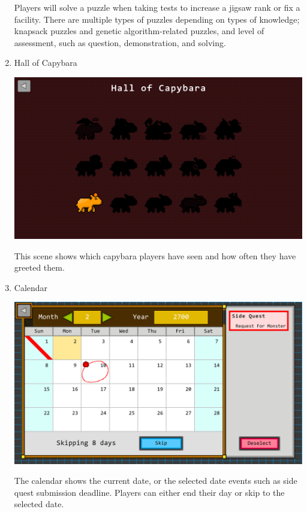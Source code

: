 \documentclass[12pt,oneside,openright,a4paper]{cpe-english-project}
\begin{document}
\begin{enumerate}
\begin{minipage}[c]{\textwidth}
	\end{minipage}
	Players will solve a puzzle when taking tests to increase a jigsaw rank or fix a facility. There are multiple types of puzzles depending on types of knowledge; knapsack puzzles and genetic algorithm-related puzzles, and level of assessment, such as question, demonstration, and solving.

	\item Hall of Capybara \\
	\begin{minipage}[c]{\textwidth}\centering
	\includegraphics[width=14cm]{figure/screenshot/screenshot-HoC.png}
	\end{minipage}
	This scene shows which capybara players have seen and how often they have greeted them.

	\item Calendar \\
	\begin{minipage}[c]{\textwidth}\centering
	\includegraphics[width=14cm]{figure/screenshot/screenshot-calendar.png}
	\end{minipage}
	The calendar shows the current date, or the selected date events such as side quest submission deadline. Players can either end their day or skip to the selected date.
	

\end{enumerate}
\end{document}
